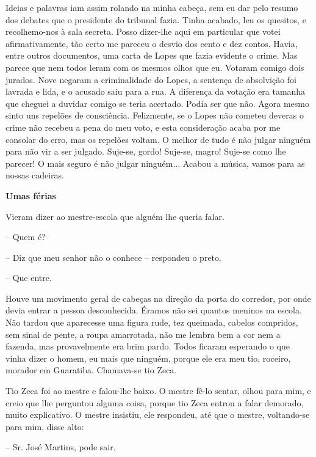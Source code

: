 Ideias e palavras iam assim rolando na minha cabeça, sem eu dar pelo
resumo dos debates que o presidente do tribunal fazia. Tinha acabado,
leu os quesitos, e recolhemo-nos à sala secreta. Posso dizer-lhe aqui em
particular que votei afirmativamente, tão certo me pareceu o desvio dos
cento e dez contos. Havia, entre outros documentos, uma carta de Lopes
que fazia evidente o crime. Mas parece que nem todos leram com os mesmos
olhos que eu. Votaram comigo dois jurados. Nove negaram a criminalidade
do Lopes, a sentença de absolvição foi lavrada e lida, e o acusado saiu
para a rua. A diferença da votação era tamanha que cheguei a duvidar
comigo se teria acertado. Podia ser que não. Agora mesmo sinto uns
repelões de consciência. Felizmente, se o Lopes não cometeu deveras o
crime não recebeu a pena do meu voto, e esta consideração acaba por me
consolar do erro, mas os repelões voltam. O melhor de tudo é não julgar
ninguém para não vir a ser julgado. Suje-se, gordo! Suje-se, magro!
Suje-se como lhe parecer! O mais seguro é não julgar ninguém... Acabou a
música, vamos para as nossas cadeiras.

\textbf{Umas férias}

Vieram dizer ao mestre-escola que alguém lhe queria falar.

-- Quem é?

-- Diz que meu senhor não o conhece -- respondeu o preto.

-- Que entre.

Houve um movimento geral de cabeças na direção da porta do corredor, por
onde devia entrar a pessoa desconhecida. Éramos não sei quantos meninos
na escola. Não tardou que aparecesse uma figura rude, tez queimada,
cabelos compridos, sem sinal de pente, a roupa amarrotada, não me lembra
bem a cor nem a fazenda, mas provavelmente era brim pardo. Todos ficaram
esperando o que vinha dizer o homem, eu mais que ninguém, porque ele era
meu tio, roceiro, morador em Guaratiba. Chamava-se tio Zeca.

Tio Zeca foi ao mestre e falou-lhe baixo. O mestre fê-lo sentar, olhou
para mim, e creio que lhe perguntou alguma coisa, porque tio Zeca entrou
a falar demorado, muito explicativo. O mestre insistiu, ele respondeu,
até que o mestre, voltando-se para mim, disse alto:

-- Sr. José Martins, pode sair.

